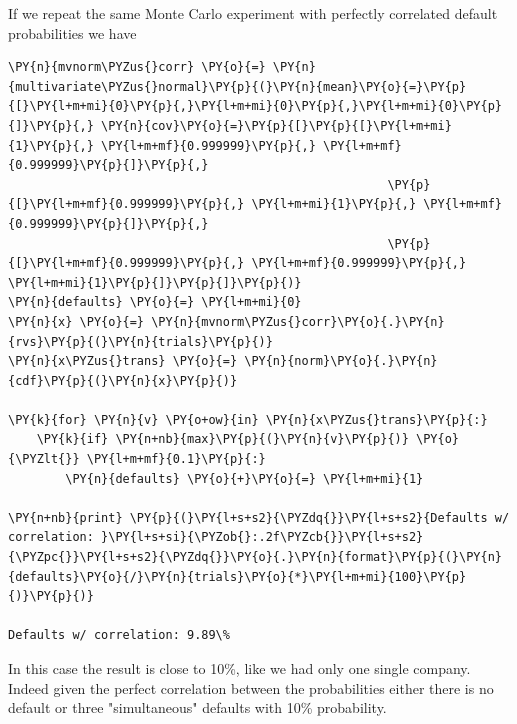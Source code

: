 If we repeat the same Monte Carlo experiment with perfectly correlated
default probabilities we have

\begin{codebox}[breakable, size=fbox, boxrule=1pt, pad at break*=1mm,colback=cellbackground, colframe=cellborder]
\begin{Verbatim}[commandchars=\\\{\}]
\PY{n}{mvnorm\PYZus{}corr} \PY{o}{=} \PY{n}{multivariate\PYZus{}normal}\PY{p}{(}\PY{n}{mean}\PY{o}{=}\PY{p}{[}\PY{l+m+mi}{0}\PY{p}{,}\PY{l+m+mi}{0}\PY{p}{,}\PY{l+m+mi}{0}\PY{p}{]}\PY{p}{,} \PY{n}{cov}\PY{o}{=}\PY{p}{[}\PY{p}{[}\PY{l+m+mi}{1}\PY{p}{,} \PY{l+m+mf}{0.999999}\PY{p}{,} \PY{l+m+mf}{0.999999}\PY{p}{]}\PY{p}{,}
                                                     \PY{p}{[}\PY{l+m+mf}{0.999999}\PY{p}{,} \PY{l+m+mi}{1}\PY{p}{,} \PY{l+m+mf}{0.999999}\PY{p}{]}\PY{p}{,}
                                                     \PY{p}{[}\PY{l+m+mf}{0.999999}\PY{p}{,} \PY{l+m+mf}{0.999999}\PY{p}{,} \PY{l+m+mi}{1}\PY{p}{]}\PY{p}{]}\PY{p}{)}
\PY{n}{defaults} \PY{o}{=} \PY{l+m+mi}{0}
\PY{n}{x} \PY{o}{=} \PY{n}{mvnorm\PYZus{}corr}\PY{o}{.}\PY{n}{rvs}\PY{p}{(}\PY{n}{trials}\PY{p}{)}
\PY{n}{x\PYZus{}trans} \PY{o}{=} \PY{n}{norm}\PY{o}{.}\PY{n}{cdf}\PY{p}{(}\PY{n}{x}\PY{p}{)}

\PY{k}{for} \PY{n}{v} \PY{o+ow}{in} \PY{n}{x\PYZus{}trans}\PY{p}{:}
    \PY{k}{if} \PY{n+nb}{max}\PY{p}{(}\PY{n}{v}\PY{p}{)} \PY{o}{\PYZlt{}} \PY{l+m+mf}{0.1}\PY{p}{:}
        \PY{n}{defaults} \PY{o}{+}\PY{o}{=} \PY{l+m+mi}{1}

\PY{n+nb}{print} \PY{p}{(}\PY{l+s+s2}{\PYZdq{}}\PY{l+s+s2}{Defaults w/ correlation: }\PY{l+s+si}{\PYZob{}:.2f\PYZcb{}}\PY{l+s+s2}{\PYZpc{}}\PY{l+s+s2}{\PYZdq{}}\PY{o}{.}\PY{n}{format}\PY{p}{(}\PY{n}{defaults}\PY{o}{/}\PY{n}{trials}\PY{o}{*}\PY{l+m+mi}{100}\PY{p}{)}\PY{p}{)}

Defaults w/ correlation: 9.89\%
\end{Verbatim}
\end{codebox}
In this case the result is close to 10\%, like we had only one single company. 
Indeed given the perfect correlation between the probabilities either there is no default or three
"simultaneous" defaults with 10\% probability.


